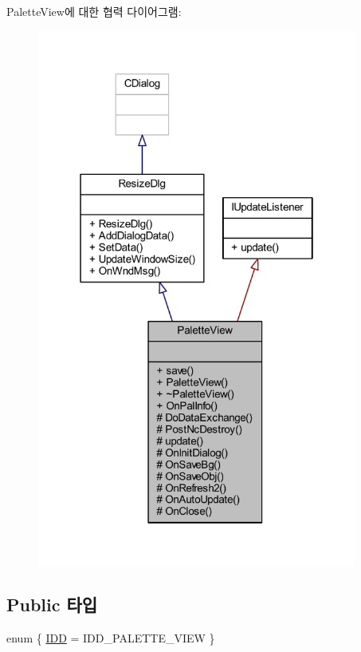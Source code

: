 Palette\+View에 대한 협력 다이어그램\+:\nopagebreak
\begin{figure}[H]
\begin{center}
\leavevmode
\includegraphics[width=298pt]{class_palette_view__coll__graph}
\end{center}
\end{figure}
\subsection*{Public 타입}
\begin{DoxyCompactItemize}
\item 
enum \{ \mbox{\hyperlink{class_palette_view_ac9e3b15a860a96ff9e01c7eb81030460a9cd7f0493230e0cee8b5dcc10a142e4d}{I\+DD}} = I\+D\+D\+\_\+\+P\+A\+L\+E\+T\+T\+E\+\_\+\+V\+I\+EW
 \}
\end{DoxyCompactItemize}
